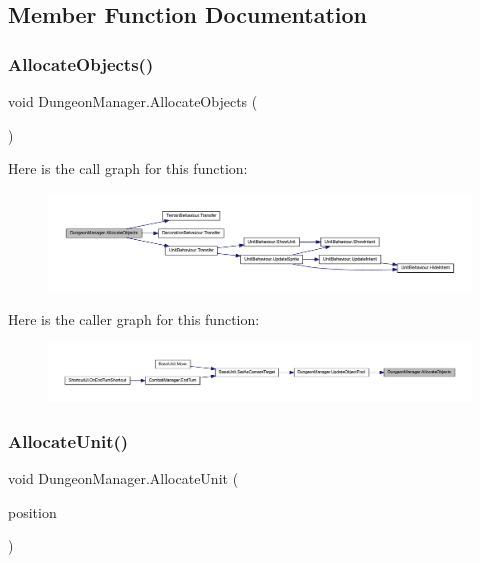 \subsection{Member Function Documentation}
\mbox{\label{class_dungeon_manager_a196f2f6754dae0d38307197bbbf033c4}} 
\subsubsection{\texorpdfstring{AllocateObjects()}{AllocateObjects()}}
{\footnotesize\ttfamily void Dungeon\+Manager.\+Allocate\+Objects (\begin{DoxyParamCaption}{ }\end{DoxyParamCaption})}

Here is the call graph for this function\+:\nopagebreak
\begin{figure}[H]
\begin{center}
\leavevmode
\includegraphics[width=350pt]{class_dungeon_manager_a196f2f6754dae0d38307197bbbf033c4_cgraph}
\end{center}
\end{figure}
Here is the caller graph for this function\+:\nopagebreak
\begin{figure}[H]
\begin{center}
\leavevmode
\includegraphics[width=350pt]{class_dungeon_manager_a196f2f6754dae0d38307197bbbf033c4_icgraph}
\end{center}
\end{figure}
\mbox{\label{class_dungeon_manager_a384a7907b2dba3017c3b4870c089e3ff}} 
\subsubsection{\texorpdfstring{AllocateUnit()}{AllocateUnit()}}
{\footnotesize\ttfamily void Dungeon\+Manager.\+Allocate\+Unit (\begin{DoxyParamCaption}\item[{Vector2\+Int}]{position }\end{DoxyParamCaption})}

